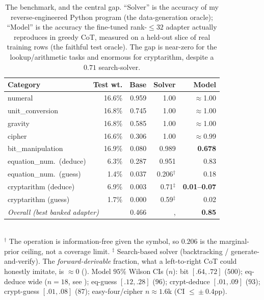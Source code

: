 \documentclass[11pt]{article}
\begin{document}
\begin{table}[tbp]
\centering
\caption{The benchmark, and the central gap. ``Solver'' is the accuracy of my
reverse-engineered Python program (the data-generation oracle); ``Model'' is the accuracy
the fine-tuned rank-$\leq\!32$ adapter actually reproduces in greedy CoT, measured on a
held-out slice of real training rows (the faithful test oracle). The gap is near-zero for
the lookup/arithmetic tasks and enormous for cryptarithm, despite a $0.71$ search-solver.}
\label{tab:master}
\small
\begin{tabular}{l r r r r}
\toprule
Category & Test wt. & Base & \textbf{Solver} & \textbf{Model} \\
\midrule
numeral             & 16.6\% & 0.959 & 1.00 & $\approx$1.00 \\
unit\_conversion    & 16.8\% & 0.745 & 1.00 & $\approx$1.00 \\
gravity             & 16.8\% & 0.585 & 1.00 & $\approx$1.00 \\
cipher              & 16.6\% & 0.306 & 1.00 & $\approx$0.99 \\
bit\_manipulation   & 16.9\% & 0.080 & 0.989 & \textbf{0.678} \\
equation\_num.\ (deduce) & 6.3\% & 0.287 & 0.951 & 0.83 \\
equation\_num.\ (guess)  & 1.4\% & 0.037 & 0.206$^\dagger$ & 0.18 \\
cryptarithm (deduce)& 6.9\% & 0.003 & 0.71$^\ddagger$ & \textbf{0.01--0.07} \\
cryptarithm (guess) & 1.7\% & 0.000 & 0.59$^\ddagger$ & 0.02 \\
\midrule
\multicolumn{2}{l}{\emph{Overall (best banked adapter)}} & 0.466 &, & \textbf{0.85} \\
\bottomrule
\end{tabular}
\\[2pt]
{\footnotesize $^\dagger$ The operation is information-free given the symbol, so $0.206$ is
the marginal-prior ceiling, not a coverage limit. $^\ddagger$ Search-based solver
(backtracking / generate-and-verify). The \emph{forward-derivable} fraction, what a
left-to-right CoT could honestly imitate, is $\approx\!0$ (). Model
$95\%$ Wilson CIs ($n$): bit $[.64,.72]$ ($500$); eq-deduce wide ($n{=}18$, see
); eq-guess $[.12,.28]$ ($96$); crypt-deduce $[.01,.09]$ ($93$);
crypt-guess $[.01,.08]$ ($87$); easy-four/cipher $n\!\approx\!1.6$k (CI $\le\!\pm0.4$pp).}
\end{table}
\end{document}
